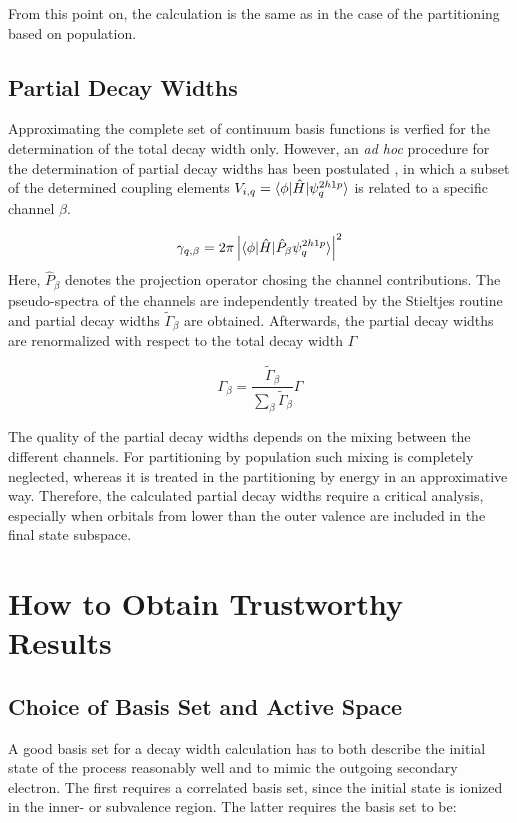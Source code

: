 From this point on, the calculation is the same as in the case of the partitioning
based on population.

\subsection{Partial Decay Widths} \label{section:partial}
Approximating the complete set of continuum basis functions is verfied for
the determination of the total decay width only. However, an \emph{ad hoc} procedure
for the determination of partial decay widths has been postulated \cite{Cacelli86},
in which a subset of the determined coupling elements
$V_{i,q} = \braket{\phi |\hat{H}| \psi_{q}^{2h1p}}$ is related to a specific channel
$\beta$.

\begin{equation}
 \gamma_{q,\beta} = 2\pi \left| \braket{\phi| \hat{H} | \hat{P}_\beta \psi_{q}^{2h1p}} 
                    \right|^2
\end{equation}
Here, $\hat{P}_\beta$ denotes the projection operator chosing the channel contributions.
The pseudo-spectra of the channels are independently treated by the Stieltjes
routine and partial decay widths $\tilde{\Gamma}_\beta$ are obtained.
Afterwards, the partial decay widths are renormalized with respect to the total
decay width $\Gamma$

\begin{equation}
 \Gamma_\beta = \frac{\tilde{\Gamma}_\beta}{\sum_\beta \tilde{\Gamma}_\beta} \Gamma
\end{equation}

The quality of the partial decay widths depends on the mixing between the different
channels. For partitioning by population such mixing is completely neglected, whereas
it is treated in the partitioning by energy in an approximative way. Therefore,
the calculated partial decay widths require a critical analysis, especially when
orbitals from lower than the outer valence are included in the final state subspace.




\section{How to Obtain Trustworthy Results}
\subsection{Choice of Basis Set and Active Space}
A good basis set for a decay width calculation has to both
describe the initial state of the process reasonably well and to mimic
the outgoing secondary electron. The first requires a correlated basis set, since
the initial state is ionized in the inner- or subvalence region.
The latter requires the basis set to be:


